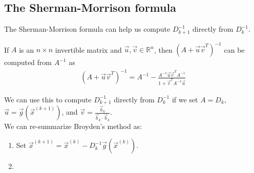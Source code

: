 \documentclass[11pt]{elegantbook}
\begin{document}
\subsection{The Sherman-Morrison formula}
The Sherman-Morrison formula can help us compute $D_{k+1}^{-1}$ directly from $D_{k}^{-1}$.
\begin{theorem}
If $A$ is an $n\times n$ invertible matrix and $\vec{u},\vec{v}\in \mathbb{R}^n$, then $(A+\vec{u}\vec{v}^T)^{-1}$ can be computed from $A^{-1}$ as
\begin{equation}
    \begin{aligned}
        (A+\vec{u}\vec{v}^T)^{-1}=A^{-1}-\frac{A^{-1}\vec{u}\vec{v}^TA^{-1}}{1+\vec{v}^T A^{-1}\vec{u}}
    \end{aligned}
    \nonumber
\end{equation}
\end{theorem}
We can use this to compute $D_{k+1}^{-1}$ directly from $D_{k}^{-1}$ if we set $A=D_k$, $\vec{u}=\vec{g}(\vec{x}^{(k+1)})$, and $\vec{v}=\frac{\vec{b}_k}{\vec{b}_k\cdot \vec{b}_k}$.\\
We can re-summarize Broyden's method as:
\begin{enumerate}
    \item Set $\vec{x}^{(k+1)}=\vec{x}^{(k)}-D_k^{-1}\vec{g}(\vec{x}^{(k)})$.
    \item 
\end{enumerate}
\end{document}
